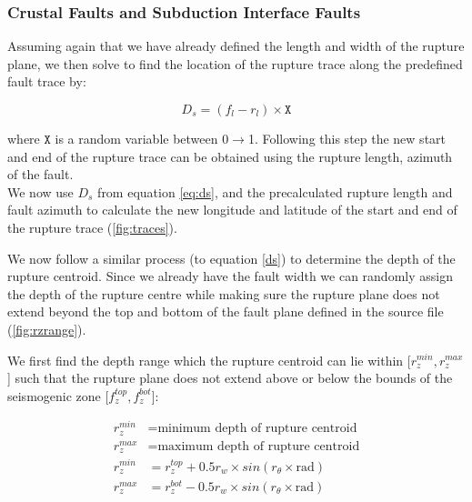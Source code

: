 \subsubsection{Crustal Faults and Subduction Interface Faults}
Assuming again that we have already defined the length and width of the rupture plane, we then solve to find the location of the rupture
trace along the predefined fault trace by:

\begin{equation} \label{eq:ds}
D_s = (f_l - r_l) \times \mathtt{X}
\end{equation}

where $\mathtt{X}$ is a random variable between 0$\rightarrow$1. Following this step the new start and end of the rupture trace can be 
obtained using the rupture length, azimuth of the fault. \\

We now use $D_s$ from equation \ref{eq:ds}, and the precalculated rupture length and fault azimuth to calculate the 
new longitude and latitude of the start and end of the rupture trace (\ref{fig:traces}). 


We now follow a similar process (to equation \ref{ds}) to determine the depth of the rupture centroid. Since we 
already have the fault width we can randomly assign the depth of the rupture centre while making sure the rupture 
plane does not extend beyond the top and bottom of the fault plane defined in the source file (\ref{fig:rzrange}). 


We first find the depth range which the rupture centroid can lie within [$r_z^{min}, r_z^{max}$] such that 
the rupture plane does not extend above or below the bounds of the seismogenic zone [$f_z^{top}, f_z^{bot}$]:

\begin{subequations} \label{drange}
\begin{align}
r_z^{min} & = \mbox{minimum depth of rupture centroid}  \\
r_z^{max} & = \mbox{maximum depth of rupture centroid}   \\
r_z^{min} & = r_z^{top} + 0.5r_w  \times sin(r_\theta  \times \mbox{rad})    \\
r_z^{max} & = r_z^{bot} - 0.5r_w  \times sin(r_\theta \times \mbox{rad})  
\end{align}
\end{subequations}

